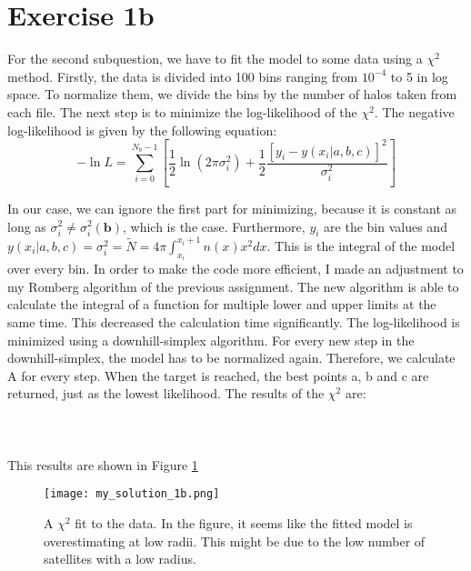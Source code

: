 \section{Exercise 1b}



For the second subquestion, we have to fit the model to some data using a $\chi^2$ method. Firstly, the data is divided into 100 bins ranging from $10^{-4}$ to 5 in log space. To normalize them, we divide the bins by the number of halos taken from each file. The next step is to minimize the log-likelihood of the $\chi^2$. The negative log-likelihood is given by the following equation: 
\begin{equation}
    -\ln{L} = \sum^{N_b-1}_{i = 0} \left[ \frac{1}{2} \ln(2\pi\sigma_i^2) +\frac{1}{2}\frac{[y_i - y(x_i|a,b,c)]^2}{\sigma_i^2}  \right]
\end{equation}

In our case, we can ignore the first part for minimizing, because it is constant as long as $\sigma_i^2 \neq \sigma_i^2(\textbf{b})$, which is the case. Furthermore, $y_i$ are the bin values and $y(x_i|a,b,c) = \sigma_i^2 = \tilde{N} = 4\pi\int^{x_i+1}_{x_i} n(x) x^2 dx$. This is the integral of the model over every bin. In order to make the code more efficient, I made an adjustment to my Romberg algorithm of the previous assignment. The new algorithm is able to calculate the integral of a function for multiple lower and upper limits at the same time. This decreased the calculation time significantly. The log-likelihood is minimized using a downhill-simplex algorithm. For every new step in the downhill-simplex, the model has to be normalized again. Therefore, we calculate A for every step. When the target is reached, the best points a, b and c are returned, just as the lowest likelihood. The results of the $\chi^2$ are: 
\\
\\

\\
\\
This results are shown in Figure \ref{fig:1b}

\begin{figure}[h!]
  \centering
  \texttt{[image: my\_solution\_1b.png]}
  \caption{A $\chi^2$ fit to the data. In the figure, it seems like the fitted model is overestimating at low radii. This might be due to the low number of satellites with a low radius.}
  \label{fig:1b}
\end{figure}


